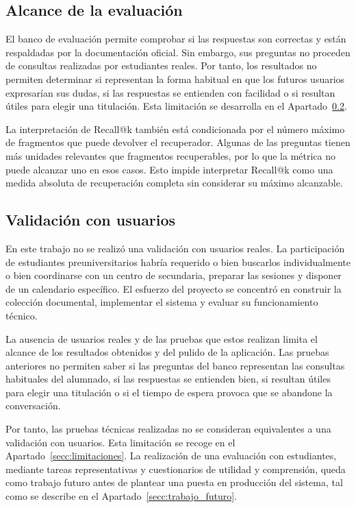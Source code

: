 \subsection{Alcance de la evaluación}

El banco de evaluación permite comprobar si las
respuestas son correctas y están respaldadas por la documentación oficial. Sin
embargo, sus preguntas no proceden de consultas realizadas por estudiantes
reales. Por tanto, los resultados no permiten determinar si representan la
forma habitual en que los futuros usuarios expresarían sus dudas, si las
respuestas se entienden con facilidad o si resultan útiles para elegir una
titulación. Esta limitación se desarrolla en el
Apartado~\ref{secc:validacion_usuarios}.

La interpretación de Recall@k también está condicionada por el número máximo de fragmentos que puede devolver el recuperador. Algunas de las preguntas tienen más unidades relevantes que fragmentos recuperables, por lo que la métrica no puede alcanzar uno en esos casos. Esto impide interpretar Recall@k como una medida absoluta de recuperación completa sin considerar su máximo alcanzable.

\subsection{Validación con usuarios}
\label{secc:validacion_usuarios}

En este trabajo no se realizó una validación con usuarios reales. La participación de estudiantes preuniversitarios habría requerido o bien buscarlos individualmente o bien coordinarse con un centro de secundaria, preparar las sesiones y disponer de un calendario específico. El esfuerzo del proyecto se concentró en construir la colección documental, implementar el sistema y evaluar su funcionamiento técnico.

La ausencia de usuarios reales y de las pruebas que estos realizan limita el alcance de los resultados obtenidos y del pulido de la aplicación. Las pruebas anteriores no permiten saber si las preguntas del banco representan las consultas habituales del alumnado, si las respuestas se entienden bien, si resultan útiles para elegir una titulación o si el tiempo de espera provoca que se abandone la conversación.

Por tanto, las pruebas técnicas realizadas no se
consideran equivalentes a una validación con usuarios. Esta limitación se
recoge en el Apartado~\ref{secc:limitaciones}. La realización de una
evaluación con estudiantes, mediante tareas representativas y cuestionarios
de utilidad y comprensión, queda como trabajo futuro antes de plantear una
puesta en producción del sistema, tal como se describe en el
Apartado~\ref{secc:trabajo_futuro}.

